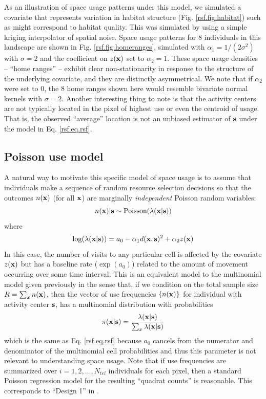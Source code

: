 \documentclass[12pt]{article}
\begin{document}
As an illustration of space usage patterns under this model, we
simulated a covariate that represents variation in habitat structure
(Fig. \ref{rsf.fig.habitat}) such as might correspond to habitat
quality.
This was simulated by using a
simple kriging interpolator  of spatial noise.
Space usage patterns for
 8 individuals in this landscape are shown in Fig. \ref{rsf.fig.homeranges},
simulated with $\alpha_{1} = 1/(2\sigma^2)$ with $\sigma = 2$ and the
coefficient on $z({\bf x})$ set to $\alpha_{2} = 1$.
These space usage densities -- ``home ranges'' -- exhibit clear
non-stationarity in response to the structure of the underlying
covariate, and they are distinctly asymmetrical.  We note that if
$\alpha_{2}$ were set to 0, the 8 home ranges shown here would
resemble bivariate normal kernels with $\sigma = 2$.  Another
interesting thing to note is that the activity centers are not
typically located in the pixel of highest use or even the centroid of
usage. That is, the observed ``average'' location is not an unbiased
estimator of ${\bf s}$ under the model in Eq. \ref{rsf.eq.rsf}.


\subsection{Poisson use model}

A natural way to motivate this specific model of space usage is to
assume that individuals make a sequence of random resource selection
decisions so that the outcomes $n({\bf x})$ (for all ${\bf
  x}$) are marginally {\it
  independent} Poisson random variables:
\[
 n({\bf x})|{\bf s} \sim \mbox{Poisson}( \lambda({\bf x}|{\bf s}))
\]
where
\[
 \log(\lambda({\bf x}|{\bf s})) = a_{0} -\alpha_{1} d({\bf x},{\bf s})^{2} +  \alpha_{2} z({\bf x})
\]
 In this case, the number of visits to any particular cell is affected
by the covariate $z({\bf x})$ but has a baseline rate ($\exp(a_{0})$)
related to the amount of movement occurring over some time interval.
This is an equivalent model to the multinomial
model given previously in the sense that, if we condition on the total
sample size $R = \sum_{x} n({\bf x})$, then the vector of use
frequencies $\{ n({\bf x}) \}$ for individual with activity center ${\bf s}$,
has a multinomial distribution with probabilities
\[
 \pi({\bf x}|{\bf s}) = \frac{\lambda({\bf x}|{\bf s})}{\sum_{x}
   \lambda({\bf x}|{\bf s})}
\]
which is the same as Eq. \ref{rsf.eq.rsf} because $a_{0}$ cancels from
the numerator and denominator of the multinomial cell probabilities
and thus this parameter is not relevant to understanding space usage.
Note that if use frequencies are summarized over
$i=1,2,\ldots,N_{tel}$ individuals for each pixel, then a standard
Poisson regression model for the resulting ``quadrat counts'' is
reasonable. This corresponds to ``Design 1'' in
\citet{manly_etal:2002}.
\end{document}
